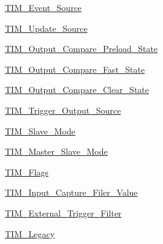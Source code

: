 \begin{DoxyCompactItemize}
\item 
\hyperlink{group___t_i_m___event___source}{T\+I\+M\+\_\+\+Event\+\_\+\+Source}
\item 
\hyperlink{group___t_i_m___update___source}{T\+I\+M\+\_\+\+Update\+\_\+\+Source}
\item 
\hyperlink{group___t_i_m___output___compare___preload___state}{T\+I\+M\+\_\+\+Output\+\_\+\+Compare\+\_\+\+Preload\+\_\+\+State}
\item 
\hyperlink{group___t_i_m___output___compare___fast___state}{T\+I\+M\+\_\+\+Output\+\_\+\+Compare\+\_\+\+Fast\+\_\+\+State}
\item 
\hyperlink{group___t_i_m___output___compare___clear___state}{T\+I\+M\+\_\+\+Output\+\_\+\+Compare\+\_\+\+Clear\+\_\+\+State}
\item 
\hyperlink{group___t_i_m___trigger___output___source}{T\+I\+M\+\_\+\+Trigger\+\_\+\+Output\+\_\+\+Source}
\item 
\hyperlink{group___t_i_m___slave___mode}{T\+I\+M\+\_\+\+Slave\+\_\+\+Mode}
\item 
\hyperlink{group___t_i_m___master___slave___mode}{T\+I\+M\+\_\+\+Master\+\_\+\+Slave\+\_\+\+Mode}
\item 
\hyperlink{group___t_i_m___flags}{T\+I\+M\+\_\+\+Flags}
\item 
\hyperlink{group___t_i_m___input___capture___filer___value}{T\+I\+M\+\_\+\+Input\+\_\+\+Capture\+\_\+\+Filer\+\_\+\+Value}
\item 
\hyperlink{group___t_i_m___external___trigger___filter}{T\+I\+M\+\_\+\+External\+\_\+\+Trigger\+\_\+\+Filter}
\item 
\hyperlink{group___t_i_m___legacy}{T\+I\+M\+\_\+\+Legacy}
\end{DoxyCompactItemize}
